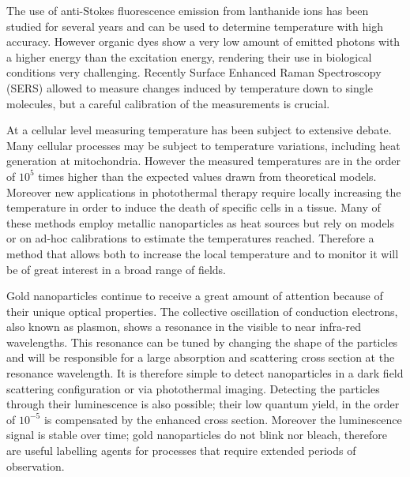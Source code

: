 The use of anti-Stokes fluorescence emission from lanthanide ions has been
studied for several years\cite{Auzel2004a} and can be used to determine
temperature with high accuracy. However organic dyes show a very low amount of
emitted photons with a higher energy than the excitation energy, rendering their
use in biological conditions very challenging. Recently Surface Enhanced Raman
Spectroscopy (SERS) allowed to measure changes induced by temperature down
to single molecules\cite{Pozzi2015}, but a careful calibration of the
measurements is crucial.

At a cellular level measuring temperature has been subject to extensive
debate\cite{Yang2011a,Suzuki2015}. Many cellular processes may be subject to
temperature variations, including heat generation at mitochondria. However the
measured temperatures\cite{Yang2011a} are in the order of $10^5$ times higher
than the expected values drawn from theoretical models\cite{Sato2014}.
Moreover new applications in photothermal therapy require locally increasing the
temperature in order to induce the death of specific cells in a
tissue\cite{Huang2008,Huang2006}. Many of these methods employ metallic
nanoparticles as heat sources\cite{Gobin2007,Hirsch2003} but rely on
models\cite{Zhao2014a} or on ad-hoc calibrations to estimate the temperatures
reached\cite{Donner2013}. Therefore a method that allows both to increase the
local temperature and to monitor it will be of great interest in a broad range
of fields.

Gold nanoparticles continue to receive a great amount of attention because of
their unique optical properties\cite{Zijlstra2011}. The collective oscillation
of conduction electrons, also known as plasmon, shows a resonance in the visible to
near infra-red wavelengths. This resonance can be tuned by changing the shape of
the particles\cite{Carattino2016} and will be responsible for a large absorption
and scattering cross section at the resonance wavelength. It is therefore simple
to detect nanoparticles in a dark field scattering\cite{Hu2008} configuration or
via photothermal imaging\cite{Berciaud2006}. Detecting the particles through
their luminescence\cite{Tcherniak2011} is also possible; their low quantum
yield\cite{Fang2012,Rao2015,Yorulmaz2012,Cheng2015}, in the order of $10^{-5}$
is compensated by the enhanced cross section. Moreover the luminescence signal
is stable over time; gold nanoparticles do not blink nor bleach, therefore are 
useful labelling agents for processes that require extended periods of
observation\cite{Wang2005}.

